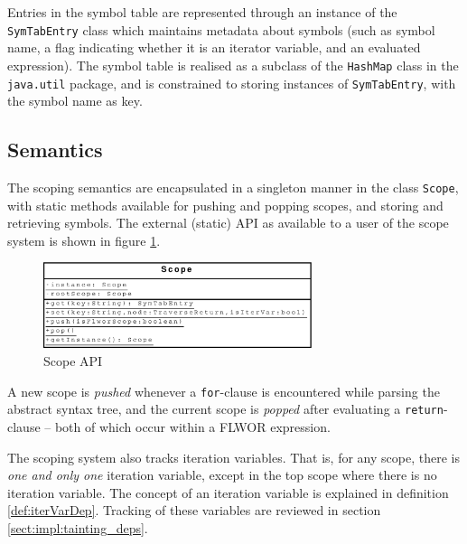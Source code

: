 Entries in the symbol table are represented through an instance of the
\texttt{SymTabEntry} class which maintains metadata about symbols (such as
symbol name, a flag indicating whether it is an iterator variable, and an
evaluated expression). The symbol table is realised as a subclass of the
\texttt{HashMap} class in the \texttt{java.util} package, and is constrained to
storing instances of \texttt{SymTabEntry}, with the symbol name as key.

\subsection{Semantics}
The scoping semantics are encapsulated in a singleton manner in the class
\texttt{Scope}, with static methods available for pushing and popping scopes,
and storing and retrieving symbols. The external (static) API as available to a
user of the scope system is shown in figure \ref{fig:impl:scope_uml}.

\begin{figure}[!htp]
\begin{center}
  \includegraphics[width=0.7\textwidth]{diagrams/scope_uml}
  \caption{Scope API}
  \label{fig:impl:scope_uml}
\end{center}
\end{figure}

A new scope is \textit{pushed} whenever a \texttt{for}-clause is encountered while
parsing the abstract syntax tree, and the current scope is \textit{popped} after
evaluating a \texttt{return}-clause -- both of which occur within a FLWOR expression.

The scoping system also tracks iteration variables. That is, for any scope,
there is \textit{one and only one} iteration variable, except in the top scope
where there is no iteration variable. The concept of an iteration variable is
explained in definition \ref{def:iterVarDep}. Tracking of these
variables are reviewed in section \ref{sect:impl:tainting_deps}.